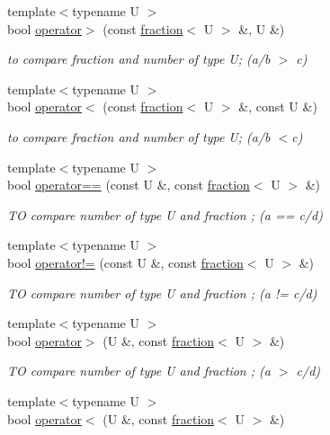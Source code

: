 \begin{DoxyCompactItemize}
{\footnotesize template$<$typename U $>$ }\\bool \hyperlink{classfraction_ad1ae5fef18269956585042b1abfd7abc}{operator$>$} (const \hyperlink{classfraction}{fraction}$<$ U $>$ \&, U \&)
\begin{DoxyCompactList}\small\item\em to compare fraction and number of type U; (a/b $>$ c) \end{DoxyCompactList}\item 
{\footnotesize template$<$typename U $>$ }\\bool \hyperlink{classfraction_adfe03f3856fdde8a08611696723811cc}{operator$<$} (const \hyperlink{classfraction}{fraction}$<$ U $>$ \&, const U \&)
\begin{DoxyCompactList}\small\item\em to compare fraction and number of type U; (a/b $<$c) \end{DoxyCompactList}\item 
{\footnotesize template$<$typename U $>$ }\\bool \hyperlink{classfraction_a2ae5db641dd3ff6c7c7cd7ff2cc87c3f}{operator==} (const U \&, const \hyperlink{classfraction}{fraction}$<$ U $>$ \&)
\begin{DoxyCompactList}\small\item\em TO compare number of type U and fraction ; (a == c/d) \end{DoxyCompactList}\item 
{\footnotesize template$<$typename U $>$ }\\bool \hyperlink{classfraction_ab80c7e144f2a388dbca530689941fceb}{operator!=} (const U \&, const \hyperlink{classfraction}{fraction}$<$ U $>$ \&)
\begin{DoxyCompactList}\small\item\em TO compare number of type U and fraction ; (a != c/d) \end{DoxyCompactList}\item 
{\footnotesize template$<$typename U $>$ }\\bool \hyperlink{classfraction_a21d2d97b1b2d35f59b9c46e44040420f}{operator$>$} (U \&, const \hyperlink{classfraction}{fraction}$<$ U $>$ \&)
\begin{DoxyCompactList}\small\item\em TO compare number of type U and fraction ; (a $>$ c/d) \end{DoxyCompactList}\item 
{\footnotesize template$<$typename U $>$ }\\bool \hyperlink{classfraction_a5df1311904060a3a8829d0773c54c646}{operator$<$} (U \&, const \hyperlink{classfraction}{fraction}$<$ U $>$ \&)

\end{DoxyCompactItemize}

